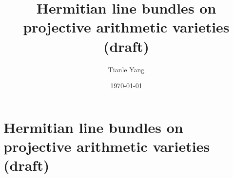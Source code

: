 \documentclass{noteformyself}
\title{Hermitian line bundles on projective arithmetic varieties (draft)}
\author{Tianle Yang}
\date{\today}
\begin{document}
    \maketitle

    \section{Hermitian line bundles on projective arithmetic varieties (draft)}



\end{document}
